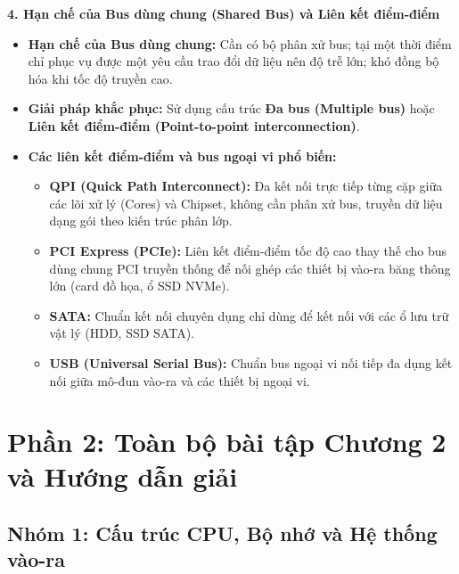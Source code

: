 \textbf{4. Hạn chế của Bus dùng chung (Shared Bus) và Liên kết điểm-điểm}
\begin{itemize}
    \item \textbf{Hạn chế của Bus dùng chung:} Cần có bộ phân xử bus; tại một thời điểm chỉ phục vụ được một yêu cầu trao đổi dữ liệu nên độ trễ lớn; khó đồng bộ hóa khi tốc độ truyền cao.
    \item \textbf{Giải pháp khắc phục:} Sử dụng cấu trúc \textbf{Đa bus (Multiple bus)} hoặc \textbf{Liên kết điểm-điểm (Point-to-point interconnection)}.
    \item \textbf{Các liên kết điểm-điểm và bus ngoại vi phổ biến:}
    \begin{itemize}
        \item \textbf{QPI (Quick Path Interconnect):} Đa kết nối trực tiếp từng cặp giữa các lõi xử lý (Cores) và Chipset, không cần phân xử bus, truyền dữ liệu dạng gói theo kiến trúc phân lớp.
        \item \textbf{PCI Express (PCIe):} Liên kết điểm-điểm tốc độ cao thay thế cho bus dùng chung PCI truyền thống để nối ghép các thiết bị vào-ra băng thông lớn (card đồ họa, ổ SSD NVMe).
        \item \textbf{SATA:} Chuẩn kết nối chuyên dụng chỉ dùng để kết nối với các ổ lưu trữ vật lý (HDD, SSD SATA).
        \item \textbf{USB (Universal Serial Bus):} Chuẩn bus ngoại vi nối tiếp đa dụng kết nối giữa mô-đun vào-ra và các thiết bị ngoại vi.
    \end{itemize}
\end{itemize}

\newpage
\section{Phần 2: Toàn bộ bài tập Chương 2 và Hướng dẫn giải}

\subsection{Nhóm 1: Cấu trúc CPU, Bộ nhớ và Hệ thống vào-ra}

